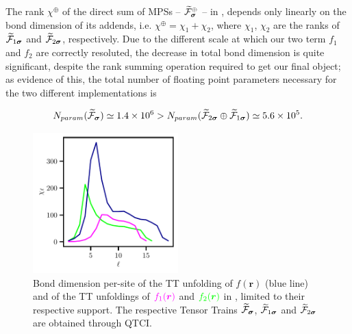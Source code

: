 The rank $\chi^\oplus$ of the direct sum of MPSs -- $\widetilde{\mathcal{F}}^\oplus_{\boldsymbol{\sigma}}$ -- in , depends only linearly on the bond dimension of its addends, i.e. $\chi^\oplus = \chi_1 + \chi_2$, where $\chi_1$, $\chi_2$ are the ranks of $\widetilde{\mathcal{F}}_{1\boldsymbol{\sigma}}$ and $\widetilde{\mathcal{F}}_{2\boldsymbol{\sigma}}$, respectively. Due to the different scale at which our two term $f_1$ and $f_2$ are correctly resoluted, the decrease in total bond dimension is quite significant, despite the rank summing operation required to get our final object; as evidence of this, the total number of floating point parameters necessary for the two different implementations is 

\begin{equation}
	N_{param}(\widetilde{\mathcal{F}}_{\boldsymbol{\sigma}}) \simeq 1.4 \times 10^6 > N_{param}(\widetilde{\mathcal{F}}_{2\boldsymbol{\sigma}} \oplus \widetilde{\mathcal{F}}_{1\boldsymbol{\sigma}}) \simeq 5.6 \times 10^5.
\end{equation}

\begin{figure}[ht!]
	\centering
	\includegraphics[width=0.5\textwidth]{figures/bonddim_localised_func+bonddim_patches.pdf}
	\caption{Bond dimension per-site of the TT unfolding of $f(\boldsymbol{r})$ (blue line) and of the TT unfoldings of ${\color{mymagenta}f_1(\boldsymbol{r})}$ and ${\color{green} f_2(\boldsymbol{r})}$ in , limited to their respective support. The respective Tensor Trains  $\widetilde{\mathcal{F}}_{\boldsymbol{\sigma}}$, $\widetilde{\mathcal{F}}_{1\boldsymbol{\sigma}}$ and $\widetilde{\mathcal{F}}_{2\boldsymbol{\sigma}}$ are obtained through QTCI. }
	\label{fig:bondDimLocalFunc}
\end{figure}


